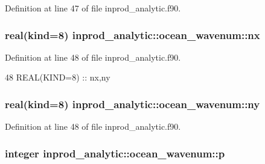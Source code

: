 Definition at line 47 of file inprod\+\_\+analytic.\+f90.

\subsubsection[{\texorpdfstring{nx}{nx}}]{\setlength{\rightskip}{0pt plus 5cm}real(kind=8) inprod\+\_\+analytic\+::ocean\+\_\+wavenum\+::nx\hspace{0.3cm}{\ttfamily [private]}}\hypertarget{structinprod__analytic_1_1ocean__wavenum_a6084ea7c554f942e74779a2be38b7d3d}{}\label{structinprod__analytic_1_1ocean__wavenum_a6084ea7c554f942e74779a2be38b7d3d}


Definition at line 48 of file inprod\+\_\+analytic.\+f90.


\begin{DoxyCode}
48      \textcolor{keywordtype}{REAL(KIND=8)} :: nx,ny
\end{DoxyCode}
\subsubsection[{\texorpdfstring{ny}{ny}}]{\setlength{\rightskip}{0pt plus 5cm}real(kind=8) inprod\+\_\+analytic\+::ocean\+\_\+wavenum\+::ny\hspace{0.3cm}{\ttfamily [private]}}\hypertarget{structinprod__analytic_1_1ocean__wavenum_a0738c305f503d7864a9073c5cea352ab}{}\label{structinprod__analytic_1_1ocean__wavenum_a0738c305f503d7864a9073c5cea352ab}


Definition at line 48 of file inprod\+\_\+analytic.\+f90.

\subsubsection[{\texorpdfstring{p}{p}}]{\setlength{\rightskip}{0pt plus 5cm}integer inprod\+\_\+analytic\+::ocean\+\_\+wavenum\+::p\hspace{0.3cm}{\ttfamily [private]}}\hypertarget{structinprod__analytic_1_1ocean__wavenum_a3170ff1b2a81b58ae81527a964682c06}{}\label{structinprod__analytic_1_1ocean__wavenum_a3170ff1b2a81b58ae81527a964682c06}


